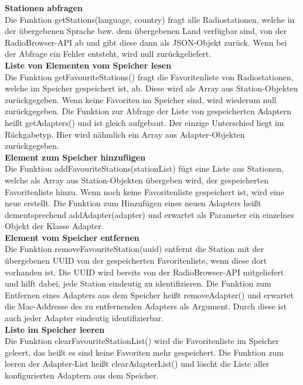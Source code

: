 \documentclass[11pt, twoside]{article}
\begin{document}
\textbf{Stationen abfragen} \\
Die Funktion getStations(language, country) fragt alle Radiostationen, welche in der übergebenen Sprache bzw. dem übergebenen Land verfügbar sind, von der RadioBrowser-API ab und gibt diese dann als JSON-Objekt zurück. Wenn bei der Abfrage ein Fehler entsteht, wird null zurückgeliefert. \newline \\
\textbf{Liste von Elementen vom Speicher lesen} \\
Die Funktion getFavouriteStations() fragt die Favoritenliste von Radiostationen, welche im Speicher gespeichert ist, ab. Diese wird als Array aus Station-Objekten zurückgegeben. Wenn keine Favoriten im Speicher sind, wird wiederum null zurückgegeben. Die Funktion zur Abfrage der Liste von gespeicherten Adaptern heißt getAdapters() und ist gleich aufgebaut. Der einzige Unterschied liegt im Rückgabetyp. Hier wird nähmlich ein Array aus Adapter-Objekten zurückgegeben.
\newline \\
\textbf{Element zum Speicher hinzufügen} \\
Die Funktion addFavouriteStations(stationList) fügt eine Liste aus Stationen, welche als Array aus Station-Objekten übergeben wird, der gespeicherten Favoritenliste hinzu. Wenn noch keine Favoritenliste gespeichert ist, wird eine neue erstellt. Die Funktion zum Hinzufügen eines neuen Adapters heißt dementsprechend addAdapter(adapter) und erwartet als Parameter ein einzelnes Objekt der Klasse Adapter.
\newline \\
\textbf{Element vom Speicher entfernen} \\
Die Funktion removeFavouriteStation(uuid) entfernt die Station mit der übergebenen UUID von der gespeicherten Favoritenliste, wenn diese dort vorhanden ist. Die UUID wird bereits von der RadioBrowser-API mitgeliefert und hilft dabei, jede Station eindeutig zu identifizieren. Die Funktion zum Entfernen eines Adapters aus dem Speicher heißt removeAdapter() und erwartet die Mac-Addresse des zu entfernenden Adapters als Argument. Durch diese ist auch jeder Adapter eindeutig identifizierbar. \newline \\
\textbf{Liste im Speicher leeren} \\
Die Funktion clearFavouriteStationList() wird die Favoritenliste im Speicher geleert, das heißt es sind keine Favoriten mehr gespeichert. Die Funktion zum leeren der Adapter-List heißt clearAdapterList() und löscht die Liste aller konfigurierten Adaptern aus dem Speicher. \newline \\ 
\end{document}
